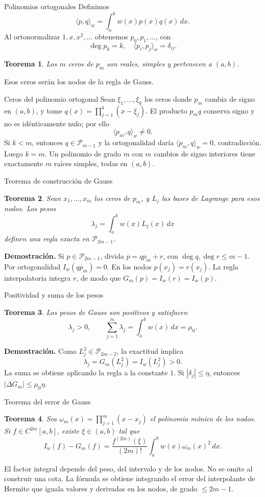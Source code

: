 \documentclass[aspectratio=169,12pt]{beamer}
\newcommand{\PiN}{\mathcal P}
\newtheorem{thm}{Teorema}
\begin{document}
\begin{frame}{Polinomios ortogonales}
Definimos
\[\langle p,q\rangle_w=\int_a^b w(x)p(x)q(x)\,dx.\]
Al ortonormalizar $1,x,x^2,\ldots$ obtenemos $p_0,p_1,\ldots$, con
\[\deg p_k=k,\quad \langle p_i,p_j\rangle_w=\delta_{ij}.\]
\begin{thm}
Los $m$ ceros de $p_m$ son reales, simples y pertenecen a $(a,b)$.
\end{thm}
Esos ceros serán los nodos de la regla de Gauss.
\end{frame}

\begin{frame}{Ceros del polinomio ortogonal}
Sean $\xi_1,\ldots,\xi_k$ los ceros donde $p_m$ cambia de signo en $(a,b)$,
y tome $q(x)=\prod_{j=1}^k(x-\xi_j)$.
El producto $p_mq$ conserva signo y no es idénticamente nulo; por ello
\[\langle p_m,q\rangle_w\ne0.\]
Si $k<m$, entonces $q\in\PiN_{m-1}$ y la ortogonalidad daría
$\langle p_m,q\rangle_w=0$, contradicción.
Luego $k=m$. Un polinomio de grado $m$ con $m$ cambios de signo interiores
tiene exactamente $m$ raíces simples, todas en $(a,b)$.
\end{frame}

\begin{frame}{Teorema de construcción de Gauss}
\begin{thm}
Sean $x_1,\ldots,x_m$ los ceros de $p_m$, y $L_j$ las bases de Lagrange
para esos nodos. Los pesos
\[\lambda_j=\int_a^b w(x)L_j(x)\,dx\]
definen una regla exacta en $\PiN_{2m-1}$.
\end{thm}
\textbf{Demostración.} Si $p\in\PiN_{2m-1}$, divida
$p=qp_m+r$, con $\deg q,\deg r\leq m-1$.
Por ortogonalidad $I_w(qp_m)=0$. En los nodos $p(x_j)=r(x_j)$.
La regla interpolatoria integra $r$, de modo que $G_m(p)=I_w(r)=I_w(p)$.
\end{frame}

\begin{frame}{Positividad y suma de los pesos}
\begin{thm}
Los pesos de Gauss son positivos y satisfacen
\[\lambda_j>0,\qquad\sum_{j=1}^m\lambda_j=\int_a^b w(x)\,dx=\mu_0.\]
\end{thm}
\textbf{Demostración.} Como $L_j^2\in\PiN_{2m-2}$, la exactitud implica
\[\lambda_j=G_m(L_j^2)=I_w(L_j^2)>0.\]
La suma se obtiene aplicando la regla a la constante $1$.
Si $|\delta_j|\leq\eta$, entonces $|\Delta G_m|\leq\mu_0\eta$.
\end{frame}

\begin{frame}{Teorema del error de Gauss}
\begin{thm}
Sea $\omega_m(x)=\prod_{j=1}^m(x-x_j)$ el polinomio mónico de los nodos.
Si $f\in C^{2m}[a,b]$, existe $\xi\in(a,b)$ tal que
\[I_w(f)-G_m(f)=\frac{f^{(2m)}(\xi)}{(2m)!}
\int_a^b w(x)\omega_m(x)^2\,dx.\]
\end{thm}
El factor integral depende del peso, del intervalo y de los nodos.
No se omite al construir una cota.
La fórmula se obtiene integrando el error del interpolante de Hermite que
iguala valores y derivadas en los nodos, de grado $\leq2m-1$.
\end{frame}
\end{document}
